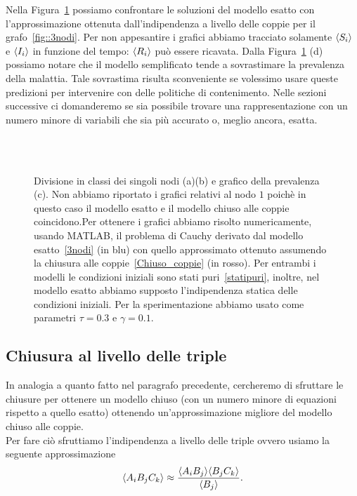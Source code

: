 Nella Figura~\ref{fig::coppie3nodi} possiamo confrontare le soluzioni del modello esatto con l'approssimazione ottenuta  dall'indipendenza a livello delle coppie per il grafo~\ref{fig::3nodi}. Per non appesantire i grafici abbiamo tracciato solamente  $\langle S_i \rangle$ e $\langle I_i \rangle$ in funzione  del tempo: $\langle  R_i \rangle$ pu\`o essere ricavata.  
Dalla Figura~\ref{fig::coppie3nodi} (d) possiamo notare che il modello semplificato tende a sovrastimare la prevalenza della malattia. Tale sovrastima risulta sconveniente se volessimo usare queste  predizioni per intervenire con delle politiche di contenimento. Nelle sezioni successive ci domanderemo se sia possibile trovare una rappresentazione con un numero minore di variabili che sia pi\`u accurato o, meglio ancora, esatta. 

\begin{figure}[!h]
	\centering
\subfloat[][Nodo 2]
{\resizebox{0.4\textwidth}{!}{} 
 \quad 
\resizebox{0.4\textwidth}{!}{ }} \\
\subfloat[][Nodo 3]
{\resizebox{0.4\textwidth}{!}{} 
 \quad 
\resizebox{0.4\textwidth}{!}{ }}
\\
\subfloat[][Prevalenza.]
{\resizebox{0.4\textwidth}{!}{}}
\caption[Confronto tra modello esatto e chiuso alle coppie per~\ref{fig::3nodi}]{Divisione in classi dei  singoli nodi (a)(b) e grafico della prevalenza (c). Non abbiamo riportato i grafici relativi al nodo $1$ poich\`e in questo caso il modello esatto e il modello chiuso alle coppie coincidono.Per ottenere i grafici abbiamo risolto numericamente,  usando MATLAB,  il problema di Cauchy derivato dal modello esatto~\eqref{3nodi} (in blu) con quello approssimato  ottenuto   assumendo la chiusura alle coppie~\eqref{Chiuso_coppie} (in rosso).  Per entrambi i modelli le condizioni iniziali sono stati puri~\eqref{statipuri},  inoltre,  nel modello esatto abbiamo supposto l'indipendenza statica delle condizioni iniziali. Per la sperimentazione abbiamo usato come parametri $\tau=0.3$ e $\gamma=0.1$.\\}
\label{fig::coppie3nodi}
\end{figure}

\newpage
\subsection{Chiusura al livello delle triple}
In analogia a quanto fatto nel paragrafo precedente, cercheremo di sfruttare le chiusure per ottenere un modello chiuso (con un numero minore di equazioni rispetto a quello esatto) ottenendo un'approssimazione migliore del modello chiuso alle coppie.\\
Per fare ci\`o sfruttiamo l'indipendenza a livello delle triple ovvero usiamo la seguente approssimazione 
$$ \langle  A_i B_j C_k  \rangle\approx \frac{\langle A_iB_j \rangle\langle B_jC_k \rangle}{\langle B_j \rangle}.$$  \\

